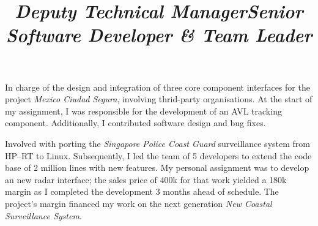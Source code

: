 \documentclass[overlapped,line,letterpaper]{res}
\begin{document}
\begin{resume}
  \title{\em Deputy Technical Manager}
  \begin{position}
    In charge of the design and integration of three core component interfaces
    for the project {\em Mexico Ciudad Segura}, involving thrid-party
    organisations. At the start of my assignment, I was responsible for the
    development of an AVL tracking component. Additionally, I contributed
    software design and bug fixes.
  \end{position}

  \newpage
  
  \title{\em Senior Software Developer \& Team Leader}
  \begin{position}
    Involved with porting the {\em Singapore Police Coast Guard} surveillance
    system from HP--RT to Linux. Subsequently, I led the team of 5 developers to
    extend the code base of 2 million lines with new features. My
    personal assignment was to develop an new radar interface; the sales price
    of 400k for that work yielded a 180k margin as I completed the development 3
    months ahead of schedule. The project's margin financed my work on the
    next generation {\em New Coastal Surveillance System}.
  \end{position}









\end{resume}
\end{document}
